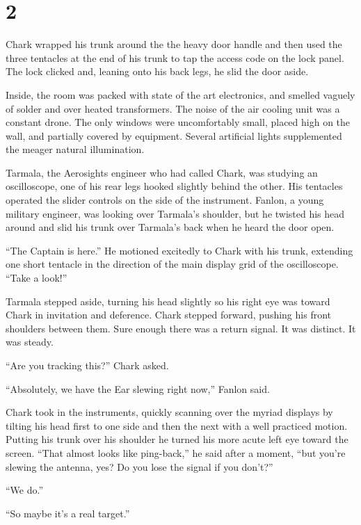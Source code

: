 
\chapter{2}

\noindent Chark wrapped his trunk around the the heavy door handle and then used the three
tentacles at the end of his trunk to tap the access code on the lock panel. The lock clicked
and, leaning onto his back legs, he slid the door aside.

Inside, the room was packed with state of the art electronics, and smelled vaguely of solder and
over heated transformers. The noise of the air cooling unit was a constant drone. The only
windows were uncomfortably small, placed high on the wall, and partially covered by equipment.
Several artificial lights supplemented the meager natural illumination.

Tarmala, the Aerosights engineer who had called Chark, was studying an oscilloscope, one of his
rear legs hooked slightly behind the other. His tentacles operated the slider controls on the
side of the instrument. Fanlon, a young military engineer, was looking over Tarmala's shoulder,
but he twisted his head around and slid his trunk over Tarmala's back when he heard the door
open.

``The Captain is here.'' He motioned excitedly to Chark with his trunk, extending one short
tentacle in the direction of the main display grid of the oscilloscope. ``Take a look!''

Tarmala stepped aside, turning his head slightly so his right eye was toward Chark in invitation
and deference. Chark stepped forward, pushing his front shoulders between them. Sure enough
there was a return signal. It was distinct. It was steady.

``Are you tracking this?'' Chark asked.

``Absolutely, we have the Ear slewing right now,'' Fanlon said.

Chark took in the instruments, quickly scanning over the myriad displays by tilting his head
first to one side and then the next with a well practiced motion. Putting his trunk over his
shoulder he turned his more acute left eye toward the screen. ``That almost looks like
ping-back,'' he said after a moment, ``but you're slewing the antenna, yes? Do you lose the
signal if you don't?''

``We do.''

``So maybe it's a real target.''

